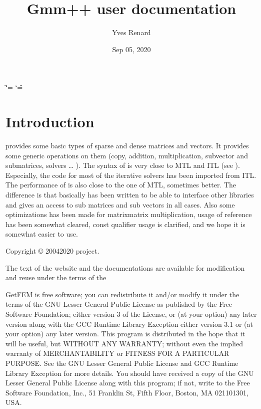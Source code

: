 \documentclass[a4paper,11pt,english]{sphinxmanual}
\title{Gmm++ user documentation}
\date{Sep 05, 2020}
\author{Yves Renard}
\begin{document}
\ifdefined\shorthandoff
  \ifnum\catcode`\=\string=\active\shorthandoff{=}\fi
  \ifnum\catcode`\"=\active{}\fi
\fi

\pagestyle{empty}
\sphinxmaketitle
\pagestyle{plain}
\sphinxtableofcontents
\pagestyle{normal}
\label{\detokenize{gmm/index::doc}}
\begin{figure}[htbp]
\centering

\noindent{}
\end{figure}




\chapter{Introduction}
\label{\detokenize{gmm/intro:introduction}}\label{\detokenize{gmm/intro:gmm-intro}}\label{\detokenize{gmm/intro::doc}}
 provides some basic types of sparse and dense matrices and vectors. It provides some generic operations on them (copy, addition, multiplication, sub\sphinxhyphen{}vector and sub\sphinxhyphen{}matrices, solvers … ). The syntax of  is very close to MTL and ITL (see ). Especially, the code for most of the iterative solvers has been imported from ITL. The performance of  is also close to the one of MTL, sometimes better. The difference is that basically  has been written to be able to interface other libraries and gives an access to sub matrices and sub vectors in all cases. Also some optimizations has been made for matrix\sphinxhyphen{}matrix multiplication, usage of reference has been somewhat cleared, const qualifier usage is clarified, and we hope it is somewhat easier to use.

Copyright © 2004\sphinxhyphen{}2020  project.

The text of the  website and the documentations are available for modification and reuse under the terms of the 

GetFEM  is  free software;  you  can  redistribute  it  and/or modify it
under  the  terms  of the  GNU  Lesser General Public License as published
by  the  Free Software Foundation;  either version 3 of the License,  or
(at your option) any later version along with the GCC Runtime Library
Exception either version 3.1 or (at your option) any later version.
This program  is  distributed  in  the  hope  that it will be useful,  but
WITHOUT ANY WARRANTY; without even the implied warranty of MERCHANTABILITY
or  FITNESS  FOR  A PARTICULAR PURPOSE.  See the GNU Lesser General Public
License and GCC Runtime Library Exception for more details.
You  should  have received a copy of the GNU Lesser General Public License
along  with  this program;  if not, write to the Free Software Foundation,
Inc., 51 Franklin St, Fifth Floor, Boston, MA  02110\sphinxhyphen{}1301, USA.
\end{document}
